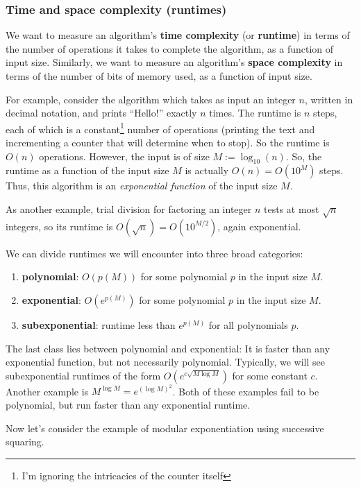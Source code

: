 \documentclass{article}
\theoremstyle{plain}
\theoremstyle{definition}
\theoremstyle{remark}
\numberwithin{theorem}{section}
\begin{document}
\subsubsection{Time and space complexity (runtimes)}

We want to measure an algorithm's \textbf{time complexity} (or \textbf{runtime}) in terms of the number of operations it takes to complete the algorithm, as a function of input size.  Similarly, we want to measure an algorithm's \textbf{space complexity} in terms of the number of bits of memory used, as a function of input size.

For example, consider the algorithm which takes as input an integer $n$, written in decimal notation, and prints ``Hello!'' exactly $n$ times.  The runtime is $n$ steps, each of which is a constant\footnote{I'm ignoring the intricacies of the counter itself} number of operations (printing the text and incrementing a counter that will determine when to stop).  So the runtime is $O(n)$ operations.  However, the input is of size $M := \log_{10}(n)$.  So, the runtime as a function of the input size $M$ is actually $O(n) = O(10^M)$ steps.  Thus, this algorithm is an \emph{exponential function} of the input size $M$.

As another example, trial division for factoring an integer $n$ tests at most $\sqrt{n}$ integers, so its runtime is $O(\sqrt{n}) = O(10^{M/2})$, again exponential.

We can divide runtimes we will encounter into three broad categories:
\begin{enumerate}
	\item \textbf{polynomial}:  $O(p(M))$ for some polynomial $p$ in the input size $M$.
	\item \textbf{exponential}:  $O(e^{p(M)})$ for some polynomial $p$ in the input size $M$.
	\item \textbf{subexponential}:  runtime less than $e^{p(M)}$ for all polynomials $p$.
\end{enumerate}

The last class lies between polynomial and exponential:  It is faster than any exponential function, but not necessarily polynomial.  Typically, we will see subexponential runtimes of the form $O( e^{c \sqrt{M \log M}})$ for some constant $c$.  Another example is $M^{\log M} = e^{(\log M)^2}$.  Both of these examples fail to be polynomial, but run faster than any exponential runtime.

Now let's consider the example of modular exponentiation using successive squaring.
\end{document}
